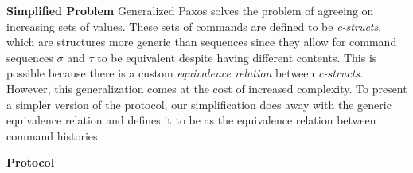 \textbf{Simplified Problem} Generalized Paxos solves the problem of agreeing on increasing sets of values. These sets of commands are defined to be \textit{c-structs}, which are structures more generic than sequences since they allow for command sequences $\sigma$ and $\tau$ to be equivalent despite having different contents. This is possible because there is a custom \textit{equivalence relation} between \textit{c-structs}. However, this generalization comes at the cost of increased complexity. To present a simpler version of the protocol, our simplification does away with the generic equivalence relation and defines it to be as the equivalence relation between command histories.  \par
\textbf{Protocol} 